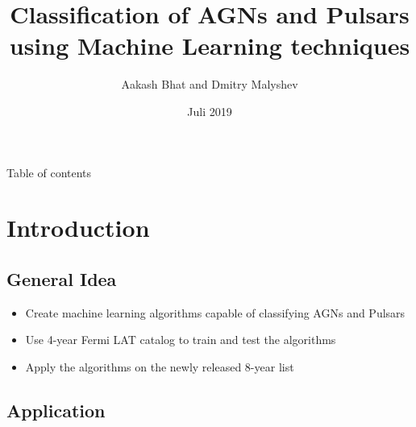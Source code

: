 \documentclass{beamer}
\title[Class] %
{Classification of AGNs and Pulsars using Machine Learning techniques }
\author{Aakash Bhat and Dmitry Malyshev}%
\institute %
{
 FAU Erlangen-Nurnberg
}
\date{Juli 2019} %
\begin{document}
\begin{frame}
  \titlepage
\end{frame}

\begin{frame}{Table of contents}
  \tableofcontents
\end{frame}





\section{Introduction}

\subsection{General Idea}

\begin{frame}

  \begin{itemize}
  \item
Create machine learning algorithms capable of classifying AGNs and Pulsars
  \item
   Use 4-year Fermi LAT catalog to train and test the algorithms
  \item
Apply the algorithms on the newly released 8-year list

  \end{itemize}
\end{frame}


\subsection{Application}
\end{document}
